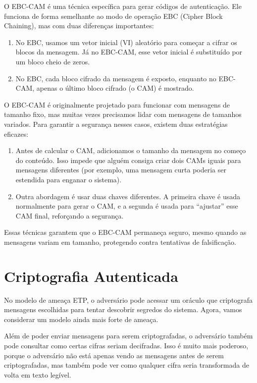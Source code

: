 O EBC-CAM é uma técnica específica para gerar códigos de autenticação.
Ele funciona de forma semelhante ao modo de operação EBC (Cipher Block Chaining), mas com duas diferenças importantes:

\begin{enumerate}
\item No EBC, usamos um vetor inicial (VI) aleatório para começar a cifrar os blocos da mensagem.
  Já no EBC-CAM, esse vetor inicial é substituído por um bloco cheio de zeros.
\item No EBC, cada bloco cifrado da mensagem é exposto, enquanto no EBC-CAM, apenas o último bloco cifrado (o CAM) é mostrado.
\end{enumerate}

O EBC-CAM é originalmente projetado para funcionar com mensagens de tamanho fixo, mas muitas vezes precisamos lidar com mensagens de tamanhos variados.
Para garantir a segurança nesses casos, existem duas estratégias eficazes:

\begin{enumerate}
\item Antes de calcular o CAM, adicionamos o tamanho da mensagem no começo do conteúdo.
  Isso impede que alguém consiga criar dois CAMs iguais para mensagens diferentes (por exemplo, uma mensagem curta poderia ser estendida para enganar o sistema).
\item Outra abordagem é usar duas chaves diferentes.
  A primeira chave é usada normalmente para gerar o CAM, e a segunda é usada para ``ajustar'' esse CAM final, reforçando a segurança.
\end{enumerate}

Essas técnicas garantem que o EBC-CAM permaneça seguro, mesmo quando as mensagens variam em tamanho, protegendo contra tentativas de falsificação.


\section{Criptografia Autenticada}
\label{label}

No modelo de ameaça ETP, o adversário pode acessar um oráculo que criptografa mensagens escolhidas para tentar descobrir segredos do sistema.
Agora, vamos considerar um modelo ainda mais forte de ameaça.

Além de poder enviar mensagens para serem criptografadas, o adversário também pode consultar como certas cifras seriam decifradas.
Isso é muito mais poderoso, porque o adversário não está apenas vendo as mensagens antes de serem criptografadas, mas também pode ver como qualquer cifra seria transformada de volta em texto legível.


